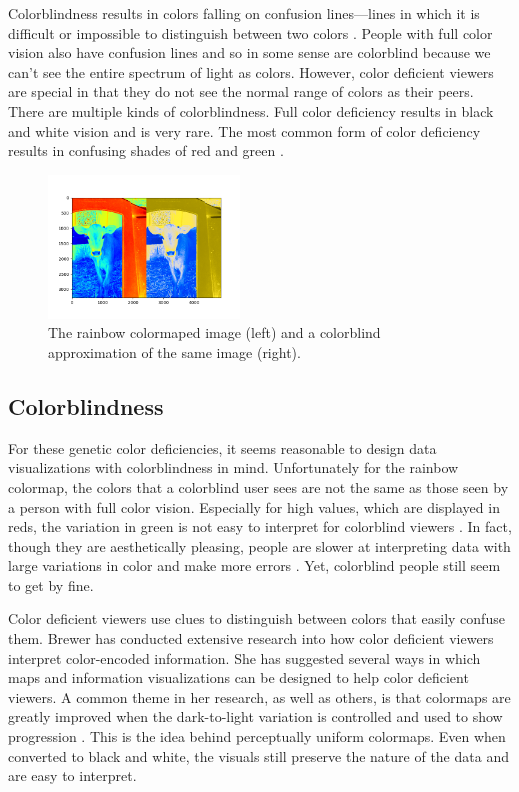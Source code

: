\documentclass[journal,12pt]{IEEEtran}
\begin{document}
Colorblindness results in colors falling on confusion lines---lines in which it
is difficult or impossible to distinguish between two colors \cite{colormapping}. People with full
color vision also have confusion lines and so in some sense are colorblind because 
we can't see the entire spectrum of light as colors. However, color deficient viewers
are special in that they do not see the normal range of colors as their peers.
There are multiple kinds of colorblindness.
Full color deficiency results in black and white vision and is very rare.
The most common form of color deficiency results in confusing shades of red and green \cite{colorchoice}.
\begin{figure}
\centering
\includegraphics[width=2in]{colorblind_rainbow1.png}%
\caption{The rainbow colormaped image (left) and a colorblind approximation of the same image (right).}
\end{figure}

\subsection{Colorblindness}

For these genetic color deficiencies, it seems reasonable to design data
visualizations with colorblindness in mind. Unfortunately for the rainbow colormap,
the colors that a colorblind user sees are not the same as those seen by a person
with full color vision. Especially for high values, which are displayed in reds,
the variation in green is not easy to interpret for colorblind viewers \cite{cvimap}. In fact,
though they are aesthetically pleasing, people are slower at interpreting data with
large variations in color and make more errors \cite{arteryvis}. Yet, colorblind people still seem
to get by fine.

Color deficient viewers use clues to distinguish between colors that easily confuse them.
Brewer has conducted extensive research into how color deficient
viewers interpret color-encoded information. She has suggested several ways in which 
maps and information visualizations can be designed to help color deficient viewers.
A common theme in her research, as well as others, is that colormaps are greatly
improved when the dark-to-light variation is controlled and used to show progression \cite{cvimap}.
This is the idea behind perceptually uniform colormaps. Even when converted to black
and white, the visuals still preserve the nature of the data and are easy to interpret.
\end{document}
